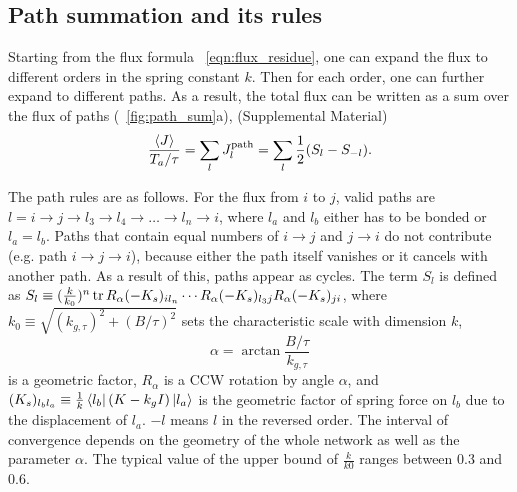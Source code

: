 \documentclass[
 preprint,
 preprintnumbers,
 amsmath,amssymb,
 aps,
 pre,
 longbibliography,
 superscriptaddress,
 10pt, twocolumn
]{revtex4-1}
\begin{document}

\subsection{Path summation and its rules}
Starting from the flux formula \eqnname~\eqref{eqn:flux_residue}, one can expand the flux to different orders in the spring constant $k$. Then for each order, one can further expand to different paths.
As a result, the total flux can be written as a sum over the flux of paths (\figurename~\ref{fig:path_sum}a), (Supplemental Material)
\begin{equation} \label{eqn:flux_path}
    \frac{\expval{J}}{T_a/\tau} = \sum_l J^\text{path}_l = \sum_l \frac{1}{2}(S_l - S_{-l}).
\end{equation}

The path rules are as follows.
For the flux from $i$ to $j$, valid paths are $l=i\rightarrow j\rightarrow l_3\rightarrow l_4\rightarrow \dots \rightarrow l_n\rightarrow i$, where $l_a$ and $l_b$ either has to be bonded or $l_a=l_b$. Paths that contain equal numbers of $i\rightarrow j$ and $j\rightarrow i$ do not contribute (e.g. path $i\rightarrow j\rightarrow i$), because either the path itself vanishes or it cancels with another path. As a result of this, paths appear as cycles.
The term $S_l$ is defined as $S_l \equiv (\frac{k}{k_0})^n \tr R_\alpha (-K_s)_{i l_n} \cdots R_\alpha (-K_s)_{l_3j} R_\alpha (-K_s)_{ji}$,
where $k_0\equiv \sqrt{(k_{g,\tau})^2 + (B/\tau)^2}$ sets the characteristic scale with dimension $k$,
\begin{equation}
\label{eq:alphadefine}
\alpha = \arctan{\frac{B/\tau}{k_{g,\tau}}}
\end{equation}
is a geometric factor, $R_\alpha$ is a CCW rotation by angle $\alpha$, and $(K_s)_{l_b l_a} \equiv \frac{1}{k}\bra{l_b}(K-k_gI)\ket{l_a}$ is the geometric factor of spring force on $l_b$ due to the displacement of $l_a$.
$-l$ means $l$ in the reversed order.
The interval of convergence depends on the geometry of the whole network as well as the parameter $\alpha$. The typical value of the upper bound of $\frac{k}{k0}$ ranges between $0.3$ and $0.6$.
\end{document}
